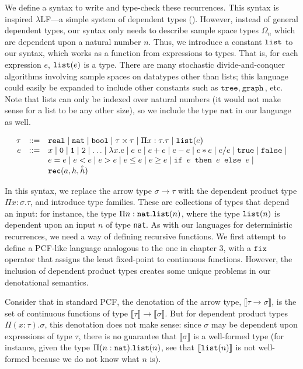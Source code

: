 We define a syntax to write and type-check these recurrences. This syntax is inspired $\lambda$LF---a simple system of 
dependent types (\cite{Pierce:2005aa}). However, instead of general dependent types, our syntax only needs to
describe sample space types $\Omega_n$ which are dependent upon a natural number $n$. Thus, we introduce
a constant $\texttt{list}$ to our syntax, which works as a function from expressions to types. That is, for each 
expression $e$, $\texttt{list}(e)$ is a type. There are many stochastic divide-and-conquer algorithms involving sample spaces
on datatypes other than lists; this language could easily be expanded to include other constants such as
 $\texttt{tree}, \ \texttt{graph}$, etc. Note that lists can only be indexed over natural numbers (it would not make 
 sense for a list to be any other size), so we include the type $\texttt{nat}$ in our language as well.
 
 \[
\begin{array}{rcl}
\tau &::=& \texttt{real} \mid \texttt{nat} \mid \texttt{bool} \mid \tau \times \tau \mid \Pi x:\tau.\tau
\mid \texttt{list}(e) \\
e &::=& x  \mid \texttt{0} \mid \texttt{1} \mid \texttt{2} \mid \dotsc \mid \lambda x.e \mid e \ e \mid e + e \mid e - e \mid  e  *  e \mid e / e \mid \texttt{true} \mid \texttt{false} \mid \\
  && e  =  e \mid e < e \mid e > e \mid e \leq e \mid e \geq e \mid 
     \texttt{if } e \texttt{ then } e \texttt{ else } e \mid \\
     && \texttt{rec}(a, h, \hat{h}) 
\end{array}
\]

In this syntax, we replace the arrow type $\sigma \rightarrow \tau$ with the dependent product type
$\Pi x:\sigma.\tau$, and introduce type families. 
These are collections of types that depend an input: for instance,
the type $\Pi n:\texttt{nat}.\texttt{list}(n)$, where the type $\texttt{list}(n)$ is dependent upon an input $n$ of type \texttt{nat}.
As with our languages for deterministic recurrences, we need a way of defining recursive functions. We first attempt
to define a PCF-like language analogous to the one in chapter 3, with a $\texttt{fix}$ operator that assigns the least
fixed-point to continuous functions. However, the inclusion of dependent product types creates some unique problems
in our denotational semantics.

Consider that in standard PCF, the denotation of the arrow type, $\llbracket \tau \rightarrow \sigma \rrbracket$, is the
set of continuous functions of type
$\llbracket \tau \rrbracket \rightarrow \llbracket \sigma \rrbracket$. But for dependent product types $\Pi(x:\tau).\sigma$,
this denotation does not make sense: 
since $\sigma$ may be dependent upon expressions of type $\tau$, there is no guarantee
that $\llbracket \sigma \rrbracket$ is a well-formed type (for instance, given the type $\Pi(n:\texttt{nat}).\texttt{list}(n)$, see that
$\llbracket \texttt{list}(n) \rrbracket$ is not well-formed because we do not know what $n$ is).

